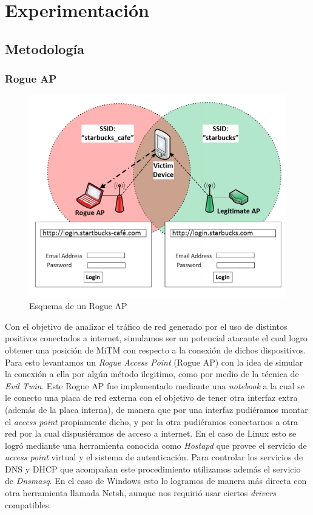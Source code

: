 \documentclass[10pt,a4paper]{article}
\begin{document}

\section{Experimentación}

\subsection{Metodología}

\subsubsection{Rogue AP}

\begin{figure}[H]
\centerline{\includegraphics[scale=0.6]{images/rogue_ap.png}}
\caption{Esquema de un Rogue AP}
\end{figure}

Con el objetivo de analizar el tráfico de red generado por el uso de distintos positivos conectados a internet, simulamos ser un potencial atacante el cual logro obtener una posición de MiTM con respecto a la conexión de dichos dispositivos. Para esto levantamos un \textit{Rogue Access Point} (Rogue AP) con la idea de simular la conexión a ella por algún método ilegitimo, como por medio de la técnica de \textit{Evil Twin}. Este Rogue AP fue implementado mediante una \textit{notebook} a la cual se le conecto una placa de red externa con el objetivo de tener otra interfaz extra (además de la placa interna), de manera que por una interfaz pudiéramos montar el \textit{access point} propiamente dicho, y por la otra pudiéramos conectarnos a otra red por la cual dispusiéramos de acceso a internet. En el caso de Linux esto se logró mediante una herramienta conocida como \textit{Hostapd} que provee el servicio de \textit{access point} virtual y el sistema de autenticación. Para controlar los servicios de DNS y DHCP que acompañan este procedimiento utilizamos además el servicio de \textit{Dnsmasq}. En el caso de Windows esto lo logramos de manera más directa con otra herramienta llamada Netsh, aunque nos requirió usar ciertos \textit{drivers} compatibles.
\end{document}
